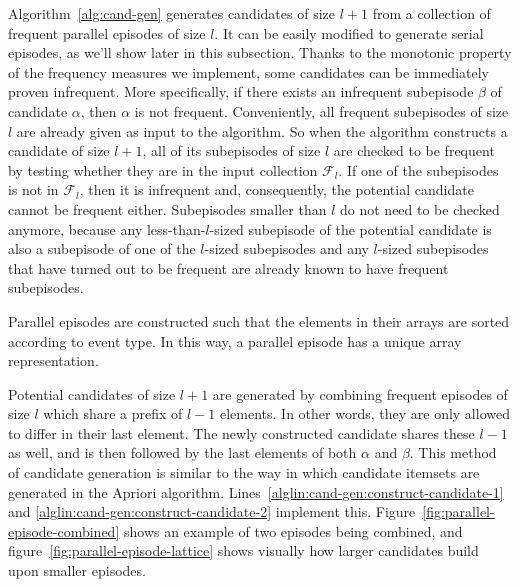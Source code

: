 
Algorithm~\ref{alg:cand-gen} generates candidates of size $ l + 1 $ from a collection of frequent parallel episodes of size $ l $. It can be easily modified to generate serial episodes, as we'll show later in this subsection. Thanks to the monotonic property of the frequency measures we implement, some candidates can be immediately proven infrequent. More specifically, if there exists an infrequent subepisode $ \beta $ of candidate $ \alpha $, then $ \alpha $ is not frequent.
Conveniently, all frequent subepisodes of size $ l $ are already given as input to the algorithm. So when the algorithm constructs a candidate of size $ l + 1 $, all of its subepisodes of size $ l $ are checked to be frequent by testing whether they are in the input collection $ \mathcal{F}_l $. If one of the subepisodes is not in $ \mathcal{F}_l $, then it is infrequent and, consequently, the potential candidate cannot be frequent either.
Subepisodes smaller than $ l $ do not need to be checked anymore, because any less-than-$ l $-sized subepisode of the potential candidate is also a subepisode of one of the $ l $-sized subepisodes and any $ l $-sized subepisodes that have turned out to be frequent are already known to have frequent subepisodes.

Parallel episodes are constructed such that the elements in their arrays are sorted according to event type. In this way, a parallel episode has a unique array representation.

Potential candidates of size $ l + 1 $ are generated by combining frequent episodes of size $ l $ which share a prefix of $ l - 1 $ elements. In other words, they are only allowed to differ in their last element. The newly constructed candidate shares these $ l - 1 $ as well, and is then followed by the last elements of both $ \alpha $ and $ \beta $. This method of candidate generation is similar to the way in which candidate itemsets are generated in the Apriori \cite{apriori97} algorithm. Lines~\ref{alglin:cand-gen:construct-candidate-1} and \ref{alglin:cand-gen:construct-candidate-2} implement this. Figure~\ref{fig:parallel-episode-combined} shows an example of two episodes being combined, and figure~\ref{fig:parallel-episode-lattice} shows visually how larger candidates build upon smaller episodes.

